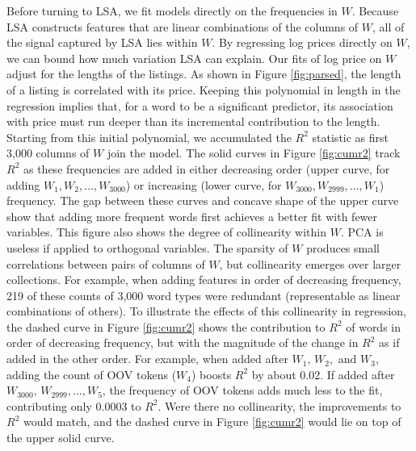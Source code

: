 \documentclass[12pt]{article}
\begin{document}
 Before turning to LSA, we fit models directly on the frequencies in $W$.
  Because LSA constructs features that are linear combinations of the columns of
 $W$, all of the signal captured by LSA lies within $W$.  By regressing log
 prices directly on $W$, we can bound how much variation LSA can explain.  Our
 fits of log price on $W$ adjust for the lengths of the listings.  As shown in
 Figure \ref{fig:parsed}, the length of a listing is correlated with its price.
  Keeping this polynomial in length in the regression implies that, for a word
 to be a significant predictor, its association with price must run deeper than
 its incremental contribution to the length.  Starting from this initial
 polynomial, we accumulated the $R^2$ statistic as first 3,000 columns of $W$
 join the model.  The solid curves in Figure \ref{fig:cumr2} track $R^2$ as
 these frequencies are added in either decreasing order (upper curve, for adding
 $W_1,W_2,\ldots,W_{3000}$) or increasing (lower curve, for $W_{3000},
 W_{2999},\ldots, W_1$) frequency.  The gap between these curves and concave
 shape of the upper curve show that adding more frequent words first achieves a
 better fit with fewer variables. This figure also shows the degree of
 collinearity within $W$.  PCA is useless if applied to orthogonal
 variables. The sparsity of $W$ produces small correlations between pairs of columns
 of $W$, but collinearity emerges over larger collections.  For example, when
 adding features in order of decreasing frequency, 219 of these counts of 3,000 word types
 were redundant (representable as linear combinations of others).  To illustrate
 the effects of this collinearity in regression, the dashed curve in Figure
 \ref{fig:cumr2} shows the contribution to $R^2$ of words in order of decreasing
 frequency, but with the magnitude of the change in $R^2$ as if added in the
 other order.  For example, when added after
 $W_1, \, W_2,$ and $W_3$, adding the count of OOV tokens ($W_4$) boosts $R^2$ by about 0.02.  If added after $W_{3000},\,W_{2999}, \ldots, W_5$, the frequency of OOV
 tokens adds much less to the fit, contributing only 0.0003 to $R^2$.  Were there 
 no collinearity, the improvements to $R^2$ would match, and the dashed curve in Figure \ref{fig:cumr2} would lie on top of the upper solid curve. 
\end{document}
